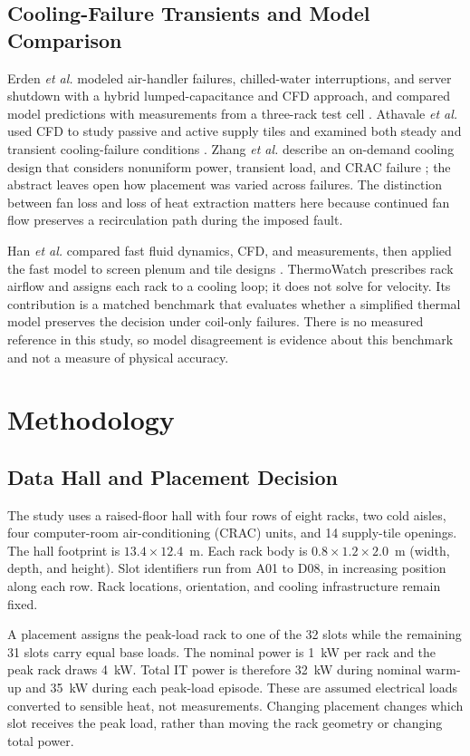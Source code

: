 \documentclass{ieeeaccess}
\begin{document}
\subsection{Cooling-Failure Transients and Model Comparison}
Erden \emph{et al.} modeled air-handler failures, chilled-water interruptions, and server shutdown with a hybrid lumped-capacitance and CFD approach, and compared model predictions with measurements from a three-rack test cell \cite{erden2014}. Athavale \emph{et al.} used CFD to study passive and active supply tiles and examined both steady and transient cooling-failure conditions \cite{athavale2018}. Zhang \emph{et al.} describe an on-demand cooling design that considers nonuniform power, transient load, and CRAC failure \cite{zhang2015}; the abstract leaves open how placement was varied across failures. The distinction between fan loss and loss of heat extraction matters here because continued fan flow preserves a recirculation path during the imposed fault.

Han \emph{et al.} compared fast fluid dynamics, CFD, and measurements, then applied the fast model to screen plenum and tile designs \cite{han2021}. ThermoWatch prescribes rack airflow and assigns each rack to a cooling loop; it does not solve for velocity. Its contribution is a matched benchmark that evaluates whether a simplified thermal model preserves the decision under coil-only failures. There is no measured reference in this study, so model disagreement is evidence about this benchmark and not a measure of physical accuracy.

\section{Methodology}

\subsection{Data Hall and Placement Decision}
The study uses a raised-floor hall with four rows of eight racks, two cold aisles, four computer-room air-conditioning (CRAC) units, and 14 supply-tile openings. The hall footprint is $13.4 \times 12.4$~m. Each rack body is $0.8 \times 1.2 \times 2.0$~m (width, depth, and height). Slot identifiers run from A01 to D08, in increasing position along each row. Rack locations, orientation, and cooling infrastructure remain fixed.

A placement assigns the peak-load rack to one of the 32 slots while the remaining 31 slots carry equal base loads. The nominal power is 1~kW per rack and the peak rack draws 4~kW. Total IT power is therefore 32~kW during nominal warm-up and 35~kW during each peak-load episode. These are assumed electrical loads converted to sensible heat, not measurements. Changing placement changes which slot receives the peak load, rather than moving the rack geometry or changing total power.
\end{document}
